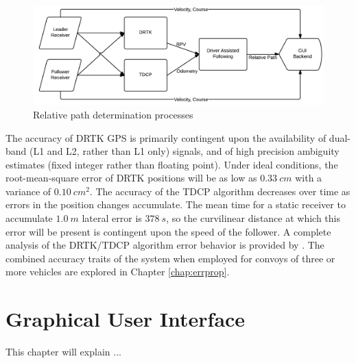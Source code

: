 \documentclass[12pt]{report}
\begin{document}
\begin{figure}[ht]
    \centering
    \includegraphics[width=6.5in]{./figs/data_algo.png}
    \caption{Relative path determination processes}
    \label{fig:drtktdcp}
\end{figure}

The accuracy of DRTK GPS is primarily contingent upon the availability of dual-band (L1 and L2, rather than L1 only) signals, and of high precision ambiguity estimates (fixed integer rather than floating point). Under ideal conditions, the root-mean-square error of DRTK positions will be as low as $0.33~cm$ with a variance of $0.10~cm^2$. 
The accuracy of the TDCP algorithm decreases over time as errors in the position changes accumulate. The mean time for a static receiver to accumulate $1.0~m$ lateral error is $378~s$, so the curvilinear distance at which this error will be present is contingent upon the speed of the follower. A complete analysis of the DRTK/TDCP algorithm error behavior is provided by \cite{scottthesis}. The combined accuracy traits of the system when employed for convoys of three or more vehicles are explored in Chapter \ref{chap:errprop}.


\chapter{Graphical User Interface}
\label{chap:gui}

This chapter will explain ...

\end{document}
